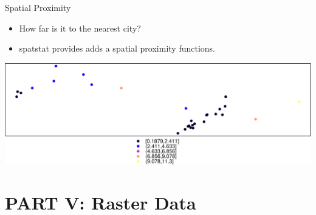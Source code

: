 \documentclass[10pt,ignorenonframetext,]{beamer}
\newenvironment{Shaded}{\begin{snugshade}}{\end{snugshade}}
\newcommand{\KeywordTok}[1]{\textcolor[rgb]{0.13,0.29,0.53}{\textbf{{#1}}}}
\newcommand{\DataTypeTok}[1]{\textcolor[rgb]{0.13,0.29,0.53}{{#1}}}
\newcommand{\StringTok}[1]{\textcolor[rgb]{0.31,0.60,0.02}{{#1}}}
\newcommand{\CommentTok}[1]{\textcolor[rgb]{0.56,0.35,0.01}{\textit{{#1}}}}
\newcommand{\NormalTok}[1]{{#1}}
\providecommand{\tightlist}{%
  \setlength{\itemsep}{0pt}\setlength{\parskip}{0pt}}
\begin{document}
\begin{frame}[fragile]{Spatial Proximity}

\begin{itemize}
\tightlist
\item
  How far is it to the nearest city?
\item
  \alert{spatstat} provides adds a spatial proximity functions.
\end{itemize}

\begin{Shaded}
\end{Shaded}

\begin{center}\includegraphics[width=0.8\linewidth]{SpatialDataLecture_files/figure-beamer/unnamed-chunk-35-1} \end{center}

\end{frame}

\section{PART V: Raster Data}\label{part-v-raster-data}
\end{document}
